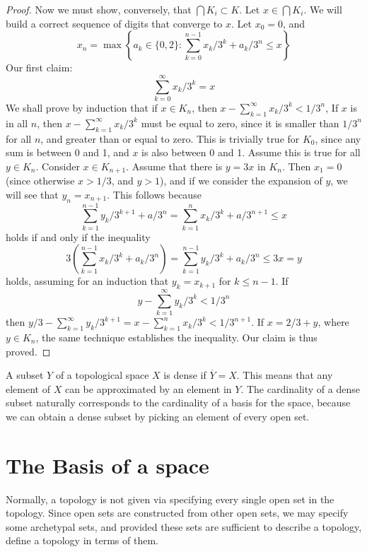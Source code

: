 \begin{example}
\begin{proof}
    Now we must show, conversely, that $\bigcap K_i \subset K$. Let $x \in \bigcap K_i$. We will build a correct sequence of digits that converge to $x$. Let $x_0 = 0$, and
    \[ x_n = \max \left\{ a_k \in \{0,2\} : \sum_{k = 0}^{n-1} x_k/3^k + a_k/3^n \leq x \right\} \]
    Our first claim:
    \[ \sum_{k = 0}^\infty x_k/3^k = x \]
    We shall prove by induction that if $x \in K_n$, then $x - \sum_{k = 1}^\infty x_k/3^k < 1/3^n$, If $x$ is in all $n$, then $x - \sum_{k = 1}^\infty x_k/3^k$ must be equal to zero, since it is smaller than $1/3^n$ for all $n$, and greater than or equal to zero. This is trivially true for $K_0$, since any sum is between 0 and 1, and $x$ is also between 0 and 1. Assume this is true for all $y \in K_n$. Consider $x \in K_{n+1}$. Assume that there is $y = 3x$ in $K_n$. Then $x_1 = 0$ (since otherwise $x > 1/3$, and $y > 1$), and if we consider the expansion of $y$, we will see that $y_n = x_{n+1}$. This follows because
    \[ \sum_{k = 1}^{n-1} y_k/3^{k+1} + a/3^n = \sum_{k = 1}^{n} x_k/3^k + a/3^{n+1} \leq x \]
    holds if and only if the inequality
    \[ 3\left(\sum_{k = 1}^{n-1} x_k/3^k + a_k/3^n\right) = \sum_{k = 1}^{n-1} y_k/3^k + a_k/3^n \leq 3x = y \]
    holds, assuming for an induction that $y_k = x_{k+1}$ for $k \leq n-1$. If
    \[ y - \sum_{k = 1}^\infty y_k/3^k < 1/3^n \]
    then $y/3 - \sum_{k = 1}^\infty y_k/3^{k+1} = x - \sum_{k = 1}^n x_k/3^k < 1/3^{n+1}$. If $x = 2/3 + y$, where $y \in K_n$, the same technique establishes the inequality. Our claim is thus proved.
\end{proof}

A subset $Y$ of a topological space $X$ is dense if $\overline{Y} = X$. This means that any element of $X$ can be approximated by an element in $Y$. The cardinality of a dense subset naturally corresponds to the cardinality of a basis for the space, because we can obtain a dense subset by picking an element of every open set.

\section{The Basis of a space}

Normally, a topology is not given via specifying every single open set in the topology. Since open sets are constructed from other open sets, we may specify some archetypal sets, and provided these sets are sufficient to describe a topology, define a topology in terms of them.


\end{example}
